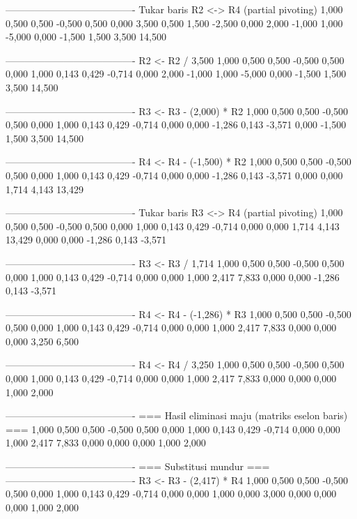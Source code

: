 \documentclass[12pt]{article}
\begin{document}
\begin{enumerate}
\begin{keluaran}
----------------------------------------
Tukar baris R2 <-> R4 (partial pivoting)
1,000   0,500   0,500   -0,500  0,500
0,000   3,500   0,500   1,500   -2,500
0,000   2,000   -1,000  1,000   -5,000
0,000   -1,500  1,500   3,500   14,500

----------------------------------------
R2 <- R2 / 3,500
1,000   0,500   0,500   -0,500  0,500
0,000   1,000   0,143   0,429   -0,714
0,000   2,000   -1,000  1,000   -5,000
0,000   -1,500  1,500   3,500   14,500

----------------------------------------
R3 <- R3 - (2,000) * R2
1,000   0,500   0,500   -0,500  0,500
0,000   1,000   0,143   0,429   -0,714
0,000   0,000   -1,286  0,143   -3,571
0,000   -1,500  1,500   3,500   14,500

----------------------------------------
R4 <- R4 - (-1,500) * R2
1,000   0,500   0,500   -0,500  0,500
0,000   1,000   0,143   0,429   -0,714
0,000   0,000   -1,286  0,143   -3,571
0,000   0,000   1,714   4,143   13,429

----------------------------------------
Tukar baris R3 <-> R4 (partial pivoting)
1,000   0,500   0,500   -0,500  0,500
0,000   1,000   0,143   0,429   -0,714
0,000   0,000   1,714   4,143   13,429
0,000   0,000   -1,286  0,143   -3,571

----------------------------------------
R3 <- R3 / 1,714
1,000   0,500   0,500   -0,500  0,500
0,000   1,000   0,143   0,429   -0,714
0,000   0,000   1,000   2,417   7,833
0,000   0,000   -1,286  0,143   -3,571

----------------------------------------
R4 <- R4 - (-1,286) * R3
1,000   0,500   0,500   -0,500  0,500
0,000   1,000   0,143   0,429   -0,714
0,000   0,000   1,000   2,417   7,833
0,000   0,000   0,000   3,250   6,500

----------------------------------------
R4 <- R4 / 3,250
1,000   0,500   0,500   -0,500  0,500
0,000   1,000   0,143   0,429   -0,714
0,000   0,000   1,000   2,417   7,833
0,000   0,000   0,000   1,000   2,000

----------------------------------------
=== Hasil eliminasi maju (matriks eselon baris) ===
1,000   0,500   0,500   -0,500  0,500
0,000   1,000   0,143   0,429   -0,714
0,000   0,000   1,000   2,417   7,833
0,000   0,000   0,000   1,000   2,000

----------------------------------------
=== Substitusi mundur ===
----------------------------------------
R3 <- R3 - (2,417) * R4
1,000   0,500   0,500   -0,500  0,500
0,000   1,000   0,143   0,429   -0,714
0,000   0,000   1,000   0,000   3,000
0,000   0,000   0,000   1,000   2,000


\end{keluaran}
\end{enumerate}
\end{document}

